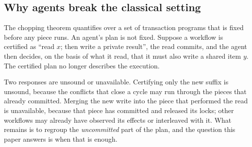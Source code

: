 \subsection{Why agents break the classical setting}

The chopping theorem quantifies over a set of transaction programs that is
fixed before any piece runs. An agent's plan is not fixed. Suppose a workflow
is certified as ``read $x$; then write a private result'', the read commits,
and the agent then decides, on the basis of what it read, that it must also
write a shared item $y$. The certified plan no longer describes the execution.

Two responses are unsound or unavailable. Certifying only the new suffix is
unsound, because the conflicts that close a cycle may run through the pieces
that already committed. Merging the new write into the piece that performed
the read is unavailable, because that piece has committed and released its
locks; other workflows may already have observed its effects or interleaved
with it. What remains is to regroup the \emph{uncommitted} part of the plan,
and the question this paper answers is when that is enough.

